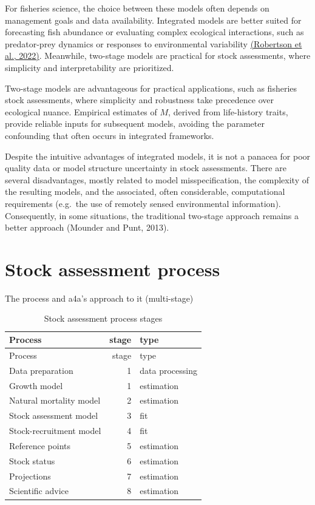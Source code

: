 \documentclass[
]{book}
\begin{document}
For fisheries science, the choice between these models often depends on management goals and data availability. Integrated models are better suited for forecasting fish abundance or evaluating complex ecological interactions, such as predator-prey dynamics or responses to environmental variability \href{https://typeset.io/papers/limited-temporal-variability-in-natural-mortality-for-t8tbfa2f}{(Robertson et al., 2022)}. Meanwhile, two-stage models are practical for stock assessments, where simplicity and interpretability are prioritized.

Two-stage models are advantageous for practical applications, such as fisheries stock assessments, where simplicity and robustness take precedence over ecological nuance. Empirical estimates of \(M\), derived from life-history traits, provide reliable inputs for subsequent models, avoiding the parameter confounding that often occurs in integrated frameworks.

Despite the intuitive advantages of integrated models, it is not a panacea for poor quality data or model structure uncertainty in stock assessments. There are several disadvantages, mostly related to model misspecification, the complexity of the resulting models, and the associated, often considerable, computational requirements (e.g.~the use of remotely sensed environmental information). Consequently, in some situations, the traditional two-stage approach remains a better approach (Mounder and Punt, 2013).

\hypertarget{stock-assessment-process}{%
\section{Stock assessment process}\label{stock-assessment-process}}

The process and a4a's approach to it (multi-stage)

\begin{longtable}[]{@{}lrl@{}}
\caption{\label{tab:sastages} Stock assessment process stages}\tabularnewline
\toprule\noalign{}
Process & stage & type \\
\midrule\noalign{}
\endfirsthead
\toprule\noalign{}
Process & stage & type \\
\midrule\noalign{}
\endhead
\bottomrule\noalign{}
\endlastfoot
Data preparation & 1 & data processing \\
Growth model & 1 & estimation \\
Natural mortality model & 2 & estimation \\
Stock assessment model & 3 & fit \\
Stock-recruitment model & 4 & fit \\
Reference points & 5 & estimation \\
Stock status & 6 & estimation \\
Projections & 7 & estimation \\
Scientific advice & 8 & estimation \\
\end{longtable}
\end{document}

